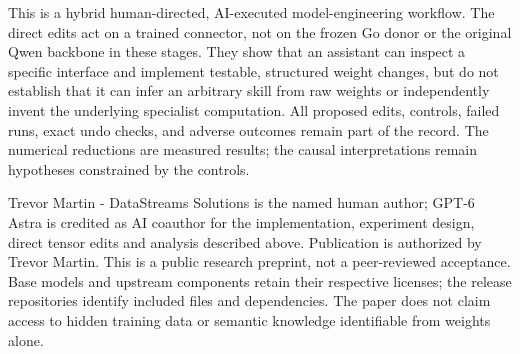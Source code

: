 \documentclass[11pt]{article}
\begin{document}
This is a hybrid human-directed, AI-executed model-engineering workflow. The direct edits act on a trained connector, not on the frozen Go donor or the original Qwen backbone in these stages. They show that an assistant can inspect a specific interface and implement testable, structured weight changes, but do not establish that it can infer an arbitrary skill from raw weights or independently invent the underlying specialist computation. All proposed edits, controls, failed runs, exact undo checks, and adverse outcomes remain part of the record. The numerical reductions are measured results; the causal interpretations remain hypotheses constrained by the controls.

Trevor Martin - DataStreams Solutions is the named human author; GPT-6 Astra is credited as AI coauthor for the implementation, experiment design, direct tensor edits and analysis described above. Publication is authorized by Trevor Martin. This is a public research preprint, not a peer-reviewed acceptance. Base models and upstream components retain their respective licenses; the release repositories identify included files and dependencies. The paper does not claim access to hidden training data or semantic knowledge identifiable from weights alone.
\end{document}

